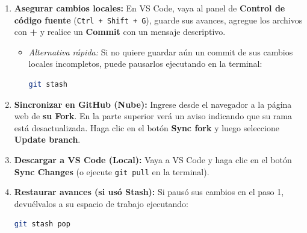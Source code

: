 \documentclass[12pt]{article}
\begin{document}
\begin{enumerate}[label=\arabic*)]
    \item \textbf{Asegurar cambios locales:} En VS Code, vaya al panel de 
    \textbf{Control de código fuente} (\lstinline|Ctrl + Shift + G|), guarde sus avances, 
    agregue los archivos con \textbf{+} y realice un \textbf{Commit} con un mensaje descriptivo. 
    \begin{itemize}
        \item \emph{Alternativa rápida:} Si no quiere guardar aún un commit de sus cambios locales incompletos, puede pausarlos ejecutando en la terminal:
\begin{lstlisting}[language=bash]
git stash
\end{lstlisting}
    \end{itemize}

    \item \textbf{Sincronizar en GitHub (Nube):} Ingrese desde el navegador a la página web de \textbf{su Fork}. En la parte superior verá un aviso indicando que su rama está desactualizada. Haga clic en el botón \textbf{Sync fork} y luego seleccione \textbf{Update branch}.

    \item \textbf{Descargar a VS Code (Local):} Vaya a VS Code y haga clic en el botón \textbf{Sync Changes} (o ejecute \lstinline|git pull| en la terminal).

    \item \textbf{Restaurar avances (si usó Stash):} Si pausó sus cambios en el paso 1, devuélvalos a su espacio de trabajo ejecutando:
\begin{lstlisting}[language=bash]
git stash pop
\end{lstlisting}
\end{enumerate}
\end{document}
